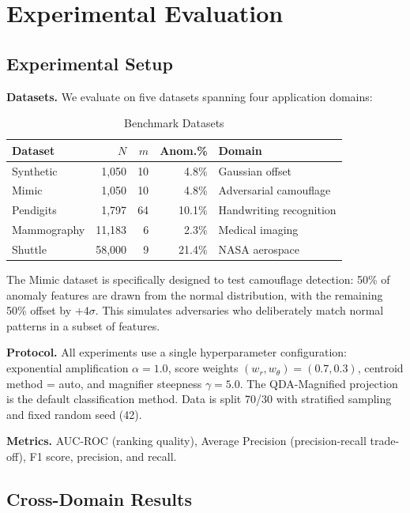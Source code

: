 \documentclass[journal]{IEEEtran}
\begin{document}
\section{Experimental Evaluation}
\label{sec:experiments}

\subsection{Experimental Setup}
\label{ssec:setup}

\textbf{Datasets.} We evaluate on five datasets spanning four application domains:

\begin{table}[h]
\centering
\caption{Benchmark Datasets}
\label{tab:datasets}
\begin{tabular}{@{}lrrrl@{}}
\toprule
\textbf{Dataset} & $N$ & $m$ & \textbf{Anom.\%} & \textbf{Domain} \\
\midrule
Synthetic & 1,050 & 10 & 4.8\% & Gaussian offset \\
Mimic & 1,050 & 10 & 4.8\% & Adversarial camouflage \\
Pendigits & 1,797 & 64 & 10.1\% & Handwriting recognition \\
Mammography & 11,183 & 6 & 2.3\% & Medical imaging \\
Shuttle & 58,000 & 9 & 21.4\% & NASA aerospace \\
\bottomrule
\end{tabular}
\end{table}

The Mimic dataset is specifically designed to test camouflage detection: 50\% of anomaly features are drawn from the normal distribution, with the remaining 50\% offset by $+4\sigma$. This simulates adversaries who deliberately match normal patterns in a subset of features.

\textbf{Protocol.} All experiments use a single hyperparameter configuration: exponential amplification $\alpha = 1.0$, score weights $(w_r, w_\theta) = (0.7, 0.3)$, centroid method = auto, and magnifier steepness $\gamma = 5.0$. The QDA-Magnified projection is the default classification method. Data is split 70/30 with stratified sampling and fixed random seed (42).

\textbf{Metrics.} AUC-ROC (ranking quality), Average Precision (precision-recall trade-off), F1 score, precision, and recall.

\subsection{Cross-Domain Results}
\label{ssec:results}
\end{document}
